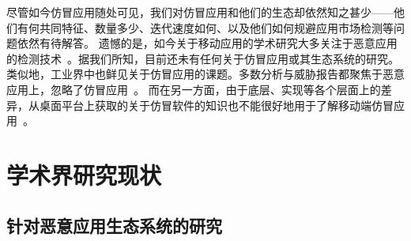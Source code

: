 尽管如今仿冒应用随处可见，我们对仿冒应用和他们的生态却依然知之甚少——他们有何共同特征、数量多少、迭代速度如何、以及他们如何规避应用市场检测等问题依然有待解答。
遗憾的是，如今关于移动应用的学术研究大多关注于恶意应用的检测技术~\cite{chen2016stormdroid,chen2018automated, chen2016towards, fan2016poster}。据我们所知，目前还未有任何关于仿冒应用或其生态系统的研究。
类似地，工业界中也鲜见关于仿冒应用的课题。多数分析与威胁报告都聚焦于恶意应用上，忽略了仿冒应用~\cite{McAfee_mobile_thread_report}。
而在另一方面，由于底层、实现等各个层面上的差异，从桌面平台上获取的关于仿冒软件的知识也不能很好地用于了解移动端仿冒应用~\cite{yin2007panorama}。

\section{学术界研究现状}

\subsection{针对恶意应用生态系统的研究}

